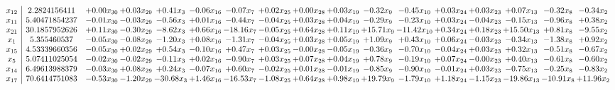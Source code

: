 \documentclass[9pt]{article}
\begin{document}
 \[\begin{array}{c| c c@{\hskip 2pt} c@{\hskip 2pt} c@{\hskip 2pt} c@{\hskip 2pt} c@{\hskip 2pt} c@{\hskip 2pt} c@{\hskip 2pt} c@{\hskip 2pt} c@{\hskip 2pt} c@{\hskip 2pt} c@{\hskip 2pt} c@{\hskip 2pt} c@{\hskip 2pt} c@{\hskip 2pt} c@{\hskip 2pt} }
 x_{12}   &  2.2824156411 & +  0.00 x_{30} & +  0.03 x_{29} & +  0.41 x_{3} & -0.06 x_{16} & -0.07 x_{7} & +  0.02 x_{25} & +  0.00 x_{28} & +  0.03 x_{19} & -0.32 x_{9} & -0.45 x_{10} & +  0.03 x_{24} & +  0.03 x_{23} & +  0.07 x_{13} & -0.32 x_{8} & -0.34 x_{2}\\
 x_{11}   &  5.40471854237 & -0.01 x_{30} & -0.03 x_{29} & -0.56 x_{3} & +  0.01 x_{16} & -0.44 x_{7} & -0.04 x_{25} & +  0.03 x_{28} & +  0.04 x_{19} & -0.29 x_{9} & -0.23 x_{10} & +  0.03 x_{24} & -0.04 x_{23} & -0.15 x_{13} & -0.96 x_{8} & +  0.38 x_{2}\\
 x_{21}   &  30.1857952626 & +  0.11 x_{30} & -0.30 x_{29} & -8.62 x_{3} & +  0.66 x_{16} & -18.16 x_{7} & -0.05 x_{25} & +  0.64 x_{28} & +  0.11 x_{19} & + 15.71 x_{9} & -11.42 x_{10} & +  0.34 x_{24} & +  0.18 x_{23} & + 15.50 x_{13} & +  0.81 x_{8} & -9.55 x_{2}\\
 x_{1}   &  5.355460537 & -0.05 x_{30} & -0.08 x_{29} & -1.20 x_{3} & +  0.08 x_{16} & -1.31 x_{7} & -0.04 x_{25} & +  0.03 x_{28} & +  0.05 x_{19} & +  1.09 x_{9} & +  0.43 x_{10} & +  0.06 x_{24} & -0.03 x_{23} & -0.34 x_{13} & -1.38 x_{8} & +  0.92 x_{2}\\
 x_{15}   &  4.53339660356 & -0.05 x_{30} & +  0.02 x_{29} & +  0.54 x_{3} & -0.10 x_{16} & +  0.47 x_{7} & +  0.03 x_{25} & -0.00 x_{28} & -0.05 x_{19} & -0.36 x_{9} & -0.70 x_{10} & -0.04 x_{24} & +  0.03 x_{23} & +  0.32 x_{13} & -0.51 x_{8} & -0.67 x_{2}\\
 x_{5}   &  5.07411025054 & -0.02 x_{30} & -0.02 x_{29} & -0.11 x_{3} & +  0.02 x_{16} & -0.90 x_{7} & +  0.03 x_{25} & +  0.07 x_{28} & +  0.04 x_{19} & +  0.78 x_{9} & -0.19 x_{10} & +  0.07 x_{24} & -0.00 x_{23} & +  0.40 x_{13} & -0.61 x_{8} & -0.60 x_{2}\\
 x_{14}   &  6.49613988379 & -0.03 x_{30} & +  0.08 x_{29} & +  0.24 x_{3} & -0.07 x_{16} & +  0.60 x_{7} & -0.02 x_{25} & +  0.01 x_{28} & -0.01 x_{19} & -0.85 x_{9} & -0.90 x_{10} & -0.01 x_{24} & +  0.03 x_{23} & -0.75 x_{13} & -0.25 x_{8} & -0.83 x_{2}\\
 x_{17}   &  70.6414751083 & -0.53 x_{30} & -1.20 x_{29} & -30.68 x_{3} & +  1.46 x_{16} & -16.53 x_{7} & -1.08 x_{25} & +  0.64 x_{28} & +  0.98 x_{19} & + 19.79 x_{9} & -1.79 x_{10} & +  1.18 x_{24} & -1.15 x_{23} & -19.86 x_{13} & -10.91 x_{8} & + 11.96 x_{2}\\

\end{array}\]
\end{document}
